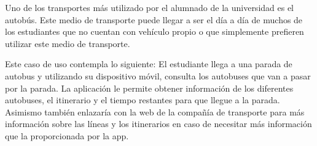 Uno de los transportes más utilizado por el alumnado de la universidad es el autobús. Este medio de transporte puede llegar a ser el día a día de muchos de los estudiantes que no cuentan con vehículo propio o que simplemente prefieren utilizar este medio de transporte. 

Este caso de uso contempla lo siguiente: El estudiante llega a una parada de autobus y utilizando su dispositivo móvil, consulta los autobuses que van a pasar por la parada. La aplicación le permite obtener información de los diferentes autobuses, el itinerario y el tiempo restantes para que llegue a la parada.  Asimismo también enlazaría con la web de la compañía de transporte para más información sobre las líneas y los itinerarios en caso de necesitar más información que la proporcionada por la app.